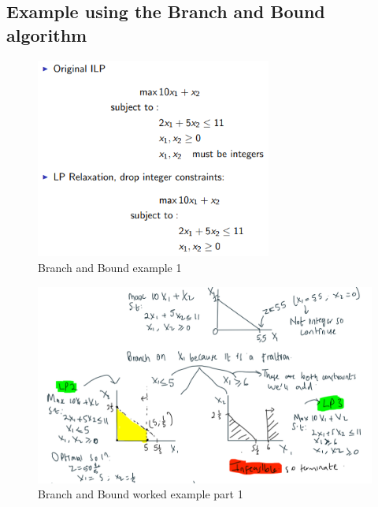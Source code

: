 \documentclass[12pt, a4paper]{article}
\begin{document}
\subsection*{Example using the Branch and Bound algorithm}
\begin{figure}[ht]
    \centering
    \includegraphics*[width=0.69\textwidth]{Branch_and_Bound_example1}
    \caption{Branch and Bound example 1}
    \label{fig: Branch and Bound example 1}
\end{figure}
\pagebreak

\begin{figure}[ht]
    \centering
    \includegraphics*[width=1.2\textwidth]{Branch_and_Bound_workedexample_part1}
    \caption{Branch and Bound worked example part 1}
    \label{fig: Branch and Bound worked example part 1}
\end{figure}
\pagebreak
\end{document}
